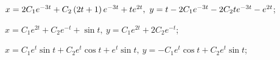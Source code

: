 \begin{enumsolsfull}
		\item \( x = 2C_1 e^{-3t} + C_2 \left( 2t + 1 \right) e^{-3t} + te^{2t}, ~ y = t - 2C_1 e^{-3t} - 2C_2t e^{-3t} - e^{2t} \); %
		\item \( x = C_1 e^{2t} + C_2 e^{-t} + \sin{t}, ~ y = C_1 e^{2t} + 2C_2e^{-t} \); %
		\item \( x = C_1 e^{t} \sin{t} + C_2 e^{t} \cos{t} + e^{t} \sin{t}, ~ y = -C_1 e^{t} \cos{t} + C_2 e^{t} \sin{t} \); %
	

\end{enumsolsfull}
